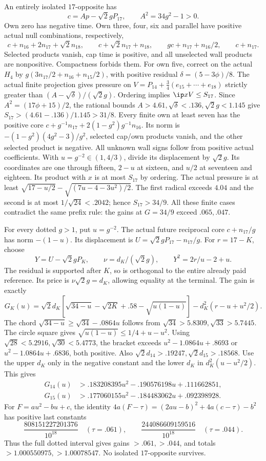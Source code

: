 An entirely isolated \(17\)-opposite has
\[
 c=A p-\sqrt2gP_{17},\qquad A^2=34g^2-1>0.
\]
Own zero has negative time. Own three, four, six and parallel
have positive actual null combinations, respectively,
\[
 c+n_{16}+2n_{17}+\sqrt2n_{18},\qquad
 c+\sqrt2n_{17}+n_{18},\qquad
 g c+n_{17}+n_{16}/2,\qquad c+n_{17}.
\]
Selected products vanish, cap time is positive, and all
unselected wall products are nonpositive. Compactness forbids them.
For own five, correct on the actual \(H_4\) by
\(g(3n_{17}/2+n_{16}+n_{15}/2)\), with positive residual
\(\delta=(5-3\phi)/8\). The actual finite projection gives
pressure on \(V=P_{14}+\tfrac34(e_{15}+\cdots+e_{18})\)
strictly greater than \((A-\sqrt\delta)/(\sqrt2g)\).
Ordering implies \(\ip xV\leq S_{17}\).
Since \(A^2=(17\phi+15)/2\), the rational bounds
\(A>4.61,\sqrt\delta<.136,\sqrt2g<1.145\) give
\(S_{17}>(4.61-.136)/1.145>31/8\).
Every finite own at least seven has the positive core
\(c+g^{-1}n_{17}+2(1-g^2)g^{-1}n_{16}\).
Its norm is \(-(1-g^2)(4g^2-3)/g^2\), selected cap/own
products vanish, and the other selected product is negative.
All unknown wall signs follow from positive actual coefficients.
With \(u=g^{-2}\in(1,4/3)\), divide its displacement by
\(\sqrt2g\). Its coordinates are one through fifteen,
\(2-u\) at sixteen, and \(u/2\) at seventeen and eighteen.
Its product with \(x\) is at most \(S_{17}\) by ordering.
The actual pressure is at least
\(\sqrt{17-u/2}-\sqrt{(7u-4-3u^2)/2}\).
The first radical exceeds \(4.04\) and the second is at most
\(1/\sqrt{24}<.2042\); hence \(S_{17}>34/9\).
All these finite cases contradict the same prefix rule:
the gains at \(G=34/9\) exceed \(.065,.047\).

For every dotted \(g>1\), put \(u=g^{-2}\).
The actual future reciprocal core \(c+n_{17}/g\)
has norm \(-(1-u)\). Its displacement is
\(U=\sqrt2gP_{17}-n_{17}/g\).
For \(r=17-K\), choose
\[
 Y=U-\sqrt2gP_K,\qquad
 \nu=d_K/(\sqrt2g),\qquad
 Y^2=2r/u-2+u.
\]
The residual is supported after \(K\), so is orthogonal
to the entire already paid reference. Its price is
\(\nu\sqrt2g=d_K\), allowing equality at the terminal.
The gain is exactly
\[
 G_K(u)=\sqrt2d_K\!
 \left[\sqrt{34-u}-\sqrt{2K}+.58-\sqrt{u(1-u)}\right]
 -d_K^2(r-u+u^2/2).
\]
The chord \(\sqrt{34-u}\geq\sqrt{34}-.0864u\) follows from
\(\sqrt{34}>5.8309,\sqrt{33}>5.7445\).
The circle square gives
\(\sqrt{u(1-u)}\leq1/4+u-u^2\).
Using \(\sqrt{28}<5.2916,\sqrt{30}<5.4773\),
the bracket exceeds \(u^2-1.0864u+.8693\) or
\(u^2-1.0864u+.6836\), both positive.
Also \(\sqrt2d_{14}>.19247,\sqrt2d_{15}>.18568\).
Use the upper \(d_K\) only in the negative constant and
the lower \(d_K\) in \(d_K^2(u-u^2/2)\).
This gives
\[
\begin{split}
G_{14}(u)&>.183208395u^2-.190576198u+.111662851,\\
G_{15}(u)&>.177060155u^2-.184483062u+.092398928.
\end{split}
\]
For \(F=au^2-bu+c\), the identity
\(4a(F-\tau)=(2au-b)^2+4a(c-\tau)-b^2\)
has positive last constants
\[
 \frac{808151227201376}{10^{18}}\quad(\tau=.061),\qquad
 \frac{244086609159516}{10^{18}}\quad(\tau=.044).
\]
Thus the full dotted interval gives gains \(>.061,>.044\),
and totals \(>1.000550975,>1.00078547\).
No isolated \(17\)-opposite survives.


